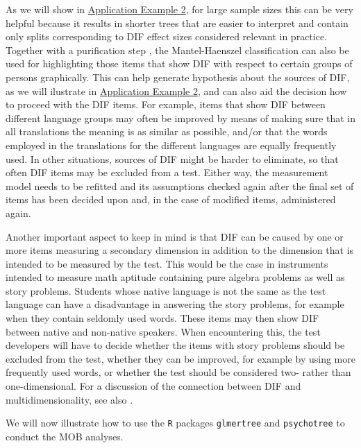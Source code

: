 \documentclass[doc,floatsintext,natbib]{apa7}
\begin{document}
As we will show in \hyperref[sec:TutorialRasch]{Application Example 2}, for large sample sizes this can be very helpful because it results in shorter trees that are easier to interpret and contain only splits corresponding to DIF effect sizes considered relevant in practice. Together with a purification step \citep[see][and Application Example 2 for details]{HenDebStr:2023:EPM}, the Mantel-Haenszel classification can also be used for highlighting those items that show DIF with respect to certain groups of persons graphically. This can help generate hypothesis about the sources of DIF, as we will ilustrate in \hyperref[sec:TutorialRasch]{Application Example 2}, and can also aid the decision how to proceed with the DIF items. 
For example, items that show DIF between different language groups may often be improved by means of making sure that in all translations the meaning is as similar as possible, and/or that the words employed in the translations for the different languages are equally frequently used. In other situations, sources of DIF might be harder to eliminate, so that often DIF items may be excluded from a test. Either way, the measurement model needs to be refitted and its assumptions checked again after the final set of items has been decided upon and, in the case of modified items, administered again. 

Another important aspect to keep in mind is that DIF can be caused by one or more items measuring a secondary dimension in addition to the dimension that is intended to be measured by the test. This would be the case in instruments intended to measure math aptitude containing pure algebra problems as well as story problems. Students whose native language is not the same as the test language can have a disadvantage in answering the story problems, for example when they contain seldomly used words. These items may then show DIF between native and non-native speakers. When encountering this, the test developers will have to decide whether the items with story problems should be excluded from the test, whether they can be improved, for example by using more frequently used words, or whether the test should be considered two- rather than one-dimensional. For a discussion of the connection between DIF and multidimensionality, see also \cite{Ack:1992,Stretal:2021:APM}.

We will now illustrate how to use the \texttt{R} packages \texttt{glmertree} and \texttt{psychotree} to conduct the MOB analyses. 
\end{document}
